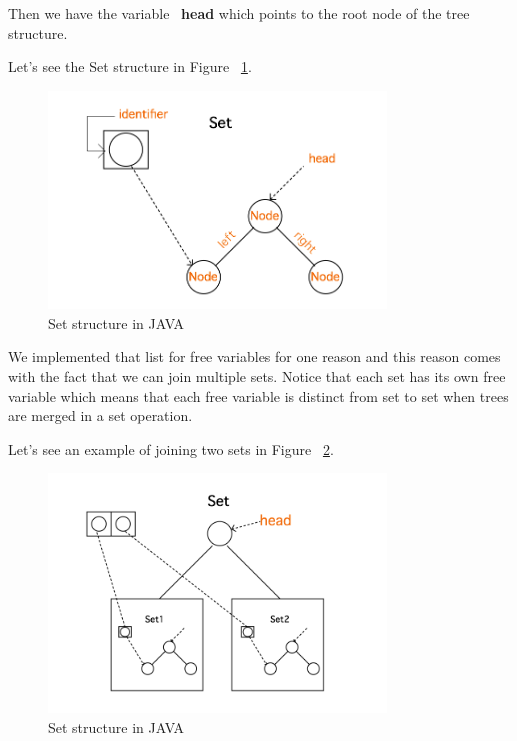 \documentclass[
  oneside,
  11pt, a4paper,
  footinclude=true,
  headinclude=true,
  cleardoublepage=empty
]{scrbook}
\begin{document}
Then we have the variable ~\textbf{head} which points to the root node of the tree structure.

Let's see the Set structure in Figure ~\ref{fig:set_structure}.

\begin{figure}[h!]
 \centering
  \includegraphics[width=0.8\textwidth]{img/set_structure.png}
  \caption{Set structure in JAVA}
  \label{fig:set_structure}
\end{figure}

We implemented that list for free variables for one reason and this reason comes with the fact that we can join multiple sets.
Notice that each set has its own free variable which means that each free variable is distinct from set to set when trees are merged in a set operation.

Let's see an example of joining two sets in Figure ~\ref{fig:sets_associaton}.

\begin{figure}[h!]
 \centering
  \includegraphics[width=0.8\textwidth]{img/sets_association.png}
  \caption{Set structure in JAVA}
  \label{fig:sets_associaton}
\end{figure}
\end{document}
